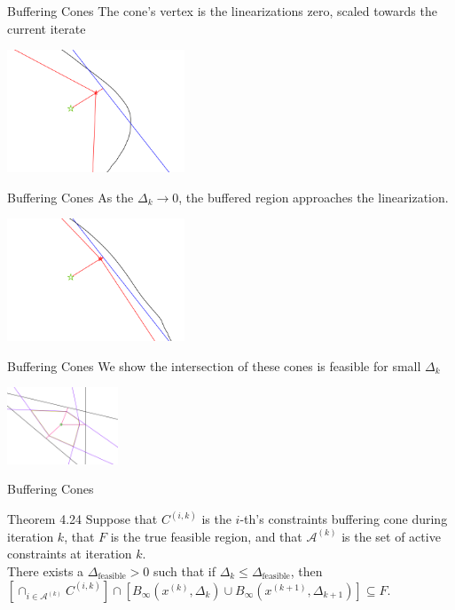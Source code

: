 \documentclass{beamer}
\newcommand{\xk}{{{x}^{(k)}}}
\newcommand{\dk}{{\Delta_k}}
\begin{document}
\begin{frame}{Buffering Cones}
	The cone's vertex is the linearizations zero, scaled towards the current iterate
	\begin{center}
		\includegraphics[width=200px]{images/explanation_2.png}
	\end{center}
\end{frame}


\begin{frame}{Buffering Cones}
	As the $\dk \to 0$, the buffered region approaches the linearization.
	\begin{center}
		\includegraphics[width=200px]{images/explanation_3.png}
	\end{center}
\end{frame}


\begin{frame}{Buffering Cones}
	We show the intersection of these cones is feasible for small $\Delta_k$
 	\begin{center}
 		\includegraphics[width=125px]{images/completed_1.png}
 	\end{center}
\end{frame}

\begin{frame}{Buffering Cones}
	\begin{block}{Theorem 4.24}
		Suppose that $C^{(i, k)}$ is the $i$-th's constraints buffering cone during iteration $k$,
		that $F$ is the true feasible region,
		and that $\mathcal A^{(k)}$ is the set of active constraints at iteration $k$. \\
		There exists a $\Delta_{\textrm{feasible}} > 0$ such that
		if $\Delta_k \le \Delta_{\textrm{feasible}}$, then 
		$\left[\cap_{i \in \mathcal A^{(k)}} C^{(i, k)} \right] \cap \left[B_{\infty}\left(\xk, \Delta_{k}\right) \cup B_{\infty}\left(x^{(k+1)}, \Delta_{k+1}\right)\right] \subseteq F$.
	\end{block}
\end{frame}
\end{document}
